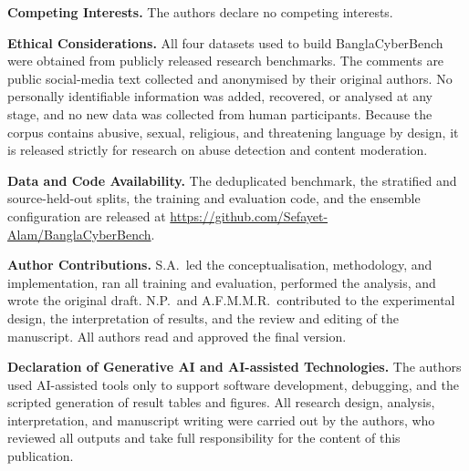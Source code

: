 \documentclass[11pt,a4paper]{article}
\newcommand{\bench}{BanglaCyberBench}
\begin{document}
\noindent\textbf{Competing Interests.} The authors declare no competing interests.

\noindent\textbf{Ethical Considerations.} All four datasets used to build \bench{} were obtained from publicly released research benchmarks. The comments are public social-media text collected and anonymised by their original authors. No personally identifiable information was added, recovered, or analysed at any stage, and no new data was collected from human participants. Because the corpus contains abusive, sexual, religious, and threatening language by design, it is released strictly for research on abuse detection and content moderation.

\noindent\textbf{Data and Code Availability.} The deduplicated benchmark, the stratified and source-held-out splits, the training and evaluation code, and the ensemble configuration are released at \url{https://github.com/Sefayet-Alam/BanglaCyberBench}.

\noindent\textbf{Author Contributions.} S.A.\ led the conceptualisation, methodology, and implementation, ran all training and evaluation, performed the analysis, and wrote the original draft. N.P.\ and A.F.M.M.R.\ contributed to the experimental design, the interpretation of results, and the review and editing of the manuscript. All authors read and approved the final version.

\noindent\textbf{Declaration of Generative AI and AI-assisted Technologies.} The authors used AI-assisted tools only to support software development, debugging, and the scripted generation of result tables and figures. All research design, analysis, interpretation, and manuscript writing were carried out by the authors, who reviewed all outputs and take full responsibility for the content of this publication.

{\footnotesize
}
\end{document}
